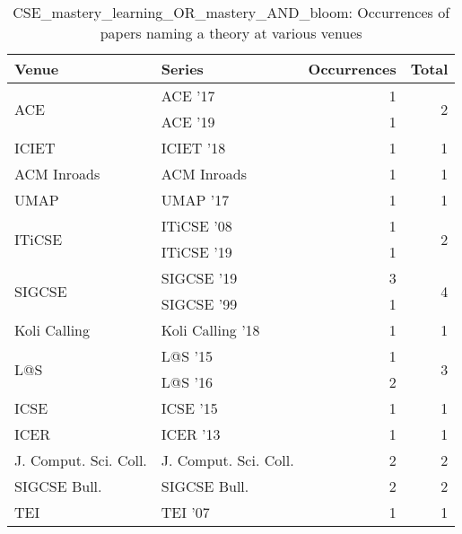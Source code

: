 \begin{table*}[t]
\begin{tabular}{llrr}
Venue & Series & Occurrences & Total\\\hline
\multirow{2}{*}{ACE } & ACE '17 & 1 & \multirow{2}{*}{2}\\
& ACE '19 & 1 &\\
\multirow{1}{*}{ICIET } & ICIET '18 & 1 & \multirow{1}{*}{1}\\
\multirow{1}{*}{ACM Inroads} & ACM Inroads & 1 & \multirow{1}{*}{1}\\
\multirow{1}{*}{UMAP } & UMAP '17 & 1 & \multirow{1}{*}{1}\\
\multirow{2}{*}{ITiCSE } & ITiCSE '08 & 1 & \multirow{2}{*}{2}\\
& ITiCSE '19 & 1 &\\
\multirow{2}{*}{SIGCSE } & SIGCSE '19 & 3 & \multirow{2}{*}{4}\\
& SIGCSE '99 & 1 &\\
\multirow{1}{*}{Koli Calling } & Koli Calling '18 & 1 & \multirow{1}{*}{1}\\
\multirow{2}{*}{L@S } & L@S '15 & 1 & \multirow{2}{*}{3}\\
& L@S '16 & 2 &\\
\multirow{1}{*}{ICSE } & ICSE '15 & 1 & \multirow{1}{*}{1}\\
\multirow{1}{*}{ICER } & ICER '13 & 1 & \multirow{1}{*}{1}\\
\multirow{1}{*}{J. Comput. Sci. Coll.} & J. Comput. Sci. Coll. & 2 & \multirow{1}{*}{2}\\
\multirow{1}{*}{SIGCSE Bull.} & SIGCSE Bull. & 2 & \multirow{1}{*}{2}\\
\multirow{1}{*}{TEI } & TEI '07 & 1 & \multirow{1}{*}{1}\\
\end{tabular}
\caption{CSE\_mastery\_learning\_OR\_mastery\_AND\_bloom: Occurrences of papers naming a theory at various venues}
\end{table*}